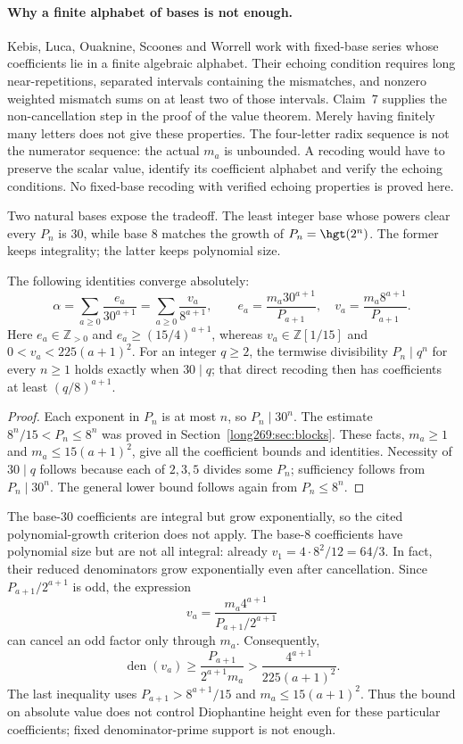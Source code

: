 \paragraph{Why a finite alphabet of bases is not enough.}
Kebis, Luca, Ouaknine, Scoones and Worrell
\cite[Definition~3, Theorem~6 and Claim~7]{kebis2024echoing}
work with fixed-base series whose coefficients lie in a finite algebraic
alphabet.  Their echoing condition requires long near-repetitions,
separated intervals containing the mismatches, and nonzero weighted
mismatch sums on at least two of those intervals.  Claim~7 supplies the
non-cancellation step in the proof of the value theorem.  Merely having
finitely many letters does not give these properties.
The four-letter radix sequence is not the numerator sequence: the actual
$m_a$ is unbounded.  A recoding would have to preserve the scalar value,
identify its coefficient alphabet and verify the echoing conditions.
No fixed-base recoding with verified echoing properties is proved here.

Two natural bases expose the tradeoff.  The least integer base whose
powers clear every $P_n$ is $30$, while base $8$ matches the growth of
$P_n=\hgt(2^n)$.  The former keeps integrality; the latter keeps polynomial
size.

\begin{proposition}
\label{long269:res:fixed-base-recoding}
The following identities converge absolutely:
\[
 \alpha=\sum_{a\ge0}\frac{e_a}{30^{a+1}}
        =\sum_{a\ge0}\frac{v_a}{8^{a+1}},\qquad
 e_a=\frac{m_a30^{a+1}}{P_{a+1}},\quad
 v_a=\frac{m_a8^{a+1}}{P_{a+1}}.
\]
Here $e_a\in\mathbb Z_{>0}$ and $e_a\ge(15/4)^{a+1}$, whereas
$v_a\in\mathbb Z[1/15]$ and $0<v_a<225(a+1)^2$.
For an integer $q\ge2$, the termwise divisibility $P_n\mid q^n$ for every
$n\ge1$ holds exactly when $30\mid q$; that direct recoding then has
coefficients at least $(q/8)^{a+1}$.
\end{proposition}
\begin{proof}
Each exponent in $P_n$ is at most $n$, so $P_n\mid30^n$.  The estimate
$8^n/15<P_n\le8^n$ was proved in Section~\ref{long269:sec:blocks}.
These facts, $m_a\ge1$ and
$m_a\le15(a+1)^2$, give all the coefficient bounds and identities.
Necessity of $30\mid q$ follows because each of $2,3,5$ divides some $P_n$;
sufficiency follows from $P_n\mid30^n$.  The general lower bound follows
again from $P_n\le8^n$.
\end{proof}
The base-$30$ coefficients are integral but grow exponentially, so the
cited polynomial-growth criterion does not apply.  The base-$8$
coefficients have polynomial size but are not all integral: already
$v_1=4\cdot8^2/12=64/3$.  In fact, their reduced denominators grow
exponentially even after cancellation.  Since $P_{a+1}/2^{a+1}$ is odd,
the expression
\[
 v_a=\frac{m_a4^{a+1}}{P_{a+1}/2^{a+1}}
\]
can cancel an odd factor only through $m_a$.  Consequently,
\[
 \operatorname{den}(v_a)
 \ge \frac{P_{a+1}}{2^{a+1}m_a}
 >\frac{4^{a+1}}{225(a+1)^2}.
\]
The last inequality uses $P_{a+1}>8^{a+1}/15$ and
$m_a\le15(a+1)^2$.  Thus the bound on absolute value does not control
Diophantine height even for these particular coefficients; fixed
denominator-prime support is not enough.

